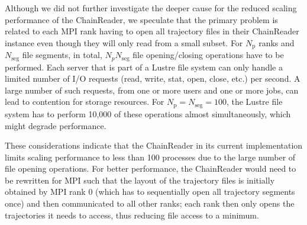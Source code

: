 Although we did not further investigate the deeper cause for the reduced scaling performance of the ChainReader, we speculate that the primary problem is related to each MPI rank having to open all trajectory files in their ChainReader instance even though they will only read from a small subset.
For $N_{\text{p}}$ ranks and $N_{\text{seg}}$ file segments, in total, $N_{p } N_{\text{seg}}$ file opening/closing operations have to be performed. 
Each server that is part of a Lustre file system can only handle a limited number of I/O requests (read, write, stat, open, close, etc.) per second.
A large number of such requests, from one or more users and one or more jobs, can lead to contention for storage resources. 
For $N_{\text{p}} = N_{\text{seg}} = 100$, the Lustre file system has to perform 10,000 of these operations almost simultaneously, which might degrade performance.

These considerations indicate that the ChainReader in its current implementation limits scaling performance to less than 100 processes due to the large number of file opening operations.
For better performance, the ChainReader would need to be rewritten for MPI such that the layout of the trajectory files is initially obtained by MPI rank 0 (which has to sequentially open all trajectory segments once) and then communicated to all other ranks; each rank then only opens the trajectories it needs to access, thus reducing file access to a minimum.


